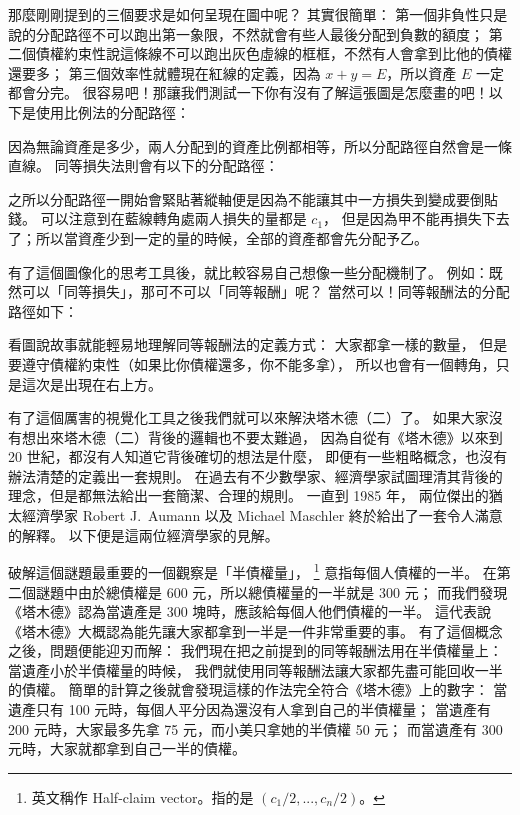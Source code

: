 \documentclass[10pt]{article}
\begin{document}
\begin{multicols*}{2}
那麼剛剛提到的三個要求是如何呈現在圖中呢？
其實很簡單：
第一個\textsf{非負性}只是說的分配路徑不可以跑出第一象限，不然就會有些人最後分配到負數的額度；
第二個\textsf{債權約束性}說這條線不可以跑出灰色虛線的框框，不然有人會拿到比他的債權還要多；
第三個\textsf{效率性}就體現在紅線的定義，因為 $x + y = E$，所以資產 $E$ 一定都會分完。
很容易吧！那讓我們測試一下你有沒有了解這張圖是怎麼畫的吧！以下是使用\textsf{比例法}的分配路徑：

因為無論資產是多少，兩人分配到的資產比例都相等，所以分配路徑自然會是一條直線。
\textsf{同等損失法}則會有以下的分配路徑：

之所以分配路徑一開始會緊貼著縱軸便是因為不能讓其中一方損失到變成要倒貼錢。
可以注意到在藍線轉角處兩人損失的量都是 $c_1$，
但是因為甲不能再損失下去了；所以當資產少到一定的量的時候，全部的資產都會先分配予乙。

有了這個圖像化的思考工具後，就比較容易自己想像一些分配機制了。
例如：既然可以「同等損失」，那可不可以「同等報酬」呢？
當然可以！\textsf{同等報酬法}的分配路徑如下：

看圖說故事就能輕易地理解\textsf{同等報酬法}的定義方式：
大家都拿一樣的數量，
但是要遵守\textsf{債權約束性}（如果比你債權還多，你不能多拿），
所以也會有一個轉角，只是這次是出現在右上方。

有了這個厲害的視覺化工具之後我們就可以來解決\textsf{塔木德（二）}了。
如果大家沒有想出來\textsf{塔木德（二）}背後的邏輯也不要太難過，
因為自從有《塔木德》以來到 20 世紀，都沒有人知道它背後確切的想法是什麼，
即便有一些粗略概念，也沒有辦法清楚的定義出一套規則。
在過去有不少數學家、經濟學家試圖理清其背後的理念，但是都無法給出一套簡潔、合理的規則。
一直到 1985 年，
兩位傑出的猶太經濟學家 Robert J.\ Aumann 以及 Michael Maschler 終於給出了一套令人滿意的解釋。
以下便是這兩位經濟學家的見解。

破解這個謎題最重要的一個觀察是「半債權量」，
\footnote{
	英文稱作 Half-claim vector。指的是 $(c_1/2,...,c_n/2)$。
}
意指每個人債權的一半。
在第二個謎題中由於總債權是 600 元，所以總債權量的一半就是 300 元；
而我們發現《塔木德》認為當遺產是 300 塊時，應該給每個人他們債權的一半。
這代表說《塔木德》大概認為能先讓大家都拿到一半是一件非常重要的事。
有了這個概念之後，問題便能迎刃而解：
我們現在把之前提到的\textsf{同等報酬法}用在半債權量上：
當遺產小於半債權量的時候，
我們就使用\textsf{同等報酬法}讓大家都先盡可能回收一半的債權。
簡單的計算之後就會發現這樣的作法完全符合《塔木德》上的數字：
當遺產只有 100 元時，每個人平分因為還沒有人拿到自己的半債權量；
當遺產有 200 元時，大家最多先拿 75 元，而小美只拿她的半債權 50 元；
而當遺產有 300 元時，大家就都拿到自己一半的債權。


\end{multicols*}
\end{document}
